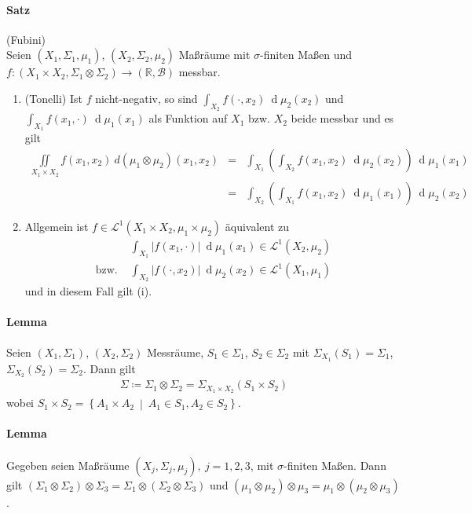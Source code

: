 \documentclass[12pt,a4paper,fleqn]{article}
\def\set#1{{\left\{ #1 \right\}}}
\def\Mid{\ \middle|\ }
\def\d{{\operatorname{d}}}
\begin{document}
\paragraph{Satz} (Fubini)\\
Seien $(X_1, \Sigma_1, \mu_1)$, $(X_2, \Sigma_2, \mu_2)$ Maßräume mit $\sigma$-finiten Maßen und\linebreak ${f\colon (X_1 \times X_2, \Sigma_1 \otimes \Sigma_2) \rightarrow (\mathbb{R}, \mathcal{B})}$ messbar.
\begin{enumerate}
\item (Tonelli) Ist $f$ nicht-negativ, so sind $\int_{X_2} f(\cdot, x_2)\ \d\mu_2(x_2)$ und $\int_{X_1} f(x_1, \cdot )\ \d\mu_1(x_1)$ als Funktion auf $X_1$ bzw. $X_2$ beide messbar und es gilt
\begin{align*}
\iint\limits_{X_1 \times X_2} f(x_1, x_2)\ d(\mu_1 \otimes \mu_2)(x_1, x_2) &=& \int_{X_1} \left(\int_{X_2} f(x_1, x_2)\ \d\mu_2(x_2)\right)\ \d\mu_1(x_1)\\
&=& \int_{X_2} \left(\int_{X_1} f(x_1, x_2)\ \d\mu_1(x_1)\right)\ \d\mu_2(x_2)
\end{align*}
\item Allgemein ist $f \in \mathscr{L}^1(X_1 \times X_2, \mu_1 \times \mu_2)$ äquivalent zu
\begin{align*}
&\int_{X_1} \vert f(x_1, \cdot) \vert\ \d\mu_1(x_1) \in \mathscr{L}^1(X_2, \mu_2)\\
\text{bzw. } & \int_{X_2} \vert f(\cdot, x_2) \vert\ \d\mu_2(x_2) \in \mathscr{L}^1(X_1, \mu_1)
\end{align*}
und in diesem Fall gilt (i).
\end{enumerate}

\paragraph{Lemma} Seien $(X_1, \Sigma_1)$, $(X_2, \Sigma_2)$ Messräume, $S_1 \in \Sigma_1$, $S_2 \in \Sigma_2$ mit \mbox{$\Sigma_{X_1}(S_1) = \Sigma_1$}, $\Sigma_{X_2}(S_2) = \Sigma_2$. Dann gilt
\begin{align*}
\Sigma \coloneqq \Sigma_1 \otimes \Sigma_2 = \Sigma_{X_1 \times X_2}(S_1 \times S_2) 
\end{align*}
wobei $S_1 \times S_2 = \set{A_1 \times A_2 \Mid A_1 \in S_1, A_2 \in S_2}$.

\paragraph{Lemma} Gegeben seien Maßräume $(X_j, \Sigma_j, \mu_j),\ j=1, 2, 3$, mit $\sigma$-finiten Maßen. Dann gilt $(\Sigma_1 \otimes \Sigma_2) \otimes \Sigma_3 = \Sigma_1 \otimes (\Sigma_2 \otimes \Sigma_3)$ und $(\mu_1 \otimes \mu_2) \otimes \mu_3 = \mu_1 \otimes (\mu_2 \otimes \mu_3)$.
\end{document}
